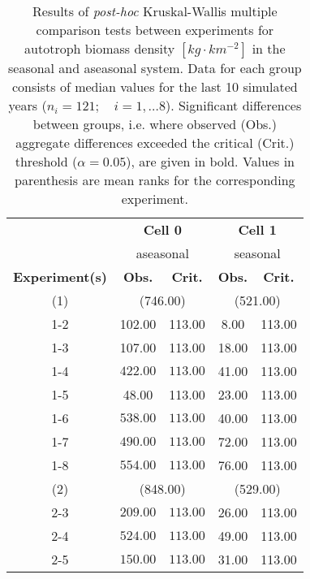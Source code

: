 \begin{table}[ht]
\centering
\small
\caption[Kruskal-Wallis multiple comparison of autotroph biomass density.]{Results of \textit{post-hoc} Kruskal-Wallis multiple comparison
                tests between experiments for autotroph biomass density $[kg\cdot km^{-2}]$ in the seasonal and aseasonal system. 
                  Data for each group consists of median values for the last 10 simulated years ($n_{i} = 121; \quad i = 1,\ldots8$). 
                  Significant differences between groups, i.e. where observed (Obs.) aggregate differences exceeded the critical (Crit.) threshold ($\alpha = 0.05$), are given in bold. Values in parenthesis are mean ranks for the corresponding experiment.} 
\label{tab:chap:res:dyn:autoBMD}
\begin{tabular*}{\textwidth}{@{\extracolsep{\fill} }ccccc}
  \toprule
& \multicolumn{2}{c}{\textbf{Cell 0}} & \multicolumn{2}{c}{\textbf{Cell 1}} \\
& \multicolumn{2}{c}{aseasonal} & \multicolumn{2}{c}{seasonal} \\
\cmidrule(lr){2-3} \cmidrule(lr){4-5}
\textbf{Experiment(s)} & \textbf{Obs.} & \textbf{Crit.} & \textbf{Obs.} & \textbf{Crit.} \\ 
  \midrule
  (1) & \multicolumn{2}{c}{(746.00)} & \multicolumn{2}{c}{(521.00)} \\ 
1-2 & 102.00 & 113.00 & 8.00 & 113.00 \\ 
  1-3 & 107.00 & 113.00 & 18.00 & 113.00 \\ 
  1-4 & \(\mathbf{422.00}\) & \(\mathbf{113.00}\) & 41.00 & 113.00 \\ 
  1-5 & 48.00 & 113.00 & 23.00 & 113.00 \\ 
  1-6 & \(\mathbf{538.00}\) & \(\mathbf{113.00}\) & 40.00 & 113.00 \\ 
  1-7 & \(\mathbf{490.00}\) & \(\mathbf{113.00}\) & 72.00 & 113.00 \\ 
  1-8 & \(\mathbf{554.00}\) & \(\mathbf{113.00}\) & 76.00 & 113.00 \\ [1ex]
  (2) & \multicolumn{2}{c}{(848.00)} & \multicolumn{2}{c}{(529.00)} \\
   2-3 & \(\mathbf{209.00}\) & \(\mathbf{113.00}\) & 26.00 & 113.00 \\ 
  2-4 & \(\mathbf{524.00}\) & \(\mathbf{113.00}\) & 49.00 & 113.00 \\ 
  2-5 & \(\mathbf{150.00}\) & \(\mathbf{113.00}\) & 31.00 & 113.00 \\ 

\end{tabular*}
\end{table}
